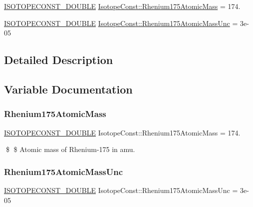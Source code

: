 \begin{DoxyCompactItemize}
\item 
\mbox{\hyperlink{group___isotope_const-_macros_ga8f45a7272ce02c0b4c65c44636ed719a}{I\+S\+O\+T\+O\+P\+E\+C\+O\+N\+S\+T\+\_\+\+D\+O\+U\+B\+LE}} \mbox{\hyperlink{group___isotope_const-_rhenium-_re175_ga8bc30c49a58f3edc6eab82715d9167f9}{Isotope\+Const\+::\+Rhenium175\+Atomic\+Mass}} = 174.
\item 
\mbox{\hyperlink{group___isotope_const-_macros_ga8f45a7272ce02c0b4c65c44636ed719a}{I\+S\+O\+T\+O\+P\+E\+C\+O\+N\+S\+T\+\_\+\+D\+O\+U\+B\+LE}} \mbox{\hyperlink{group___isotope_const-_rhenium-_re175_ga77a02acda7e5a92b5cf4a94a99b388d1}{Isotope\+Const\+::\+Rhenium175\+Atomic\+Mass\+Unc}} = 3e-\/05
\end{DoxyCompactItemize}


\subsection{Detailed Description}


\subsection{Variable Documentation}
\mbox{\label{group___isotope_const-_rhenium-_re175_ga8bc30c49a58f3edc6eab82715d9167f9}} 
\subsubsection{\texorpdfstring{Rhenium175\+Atomic\+Mass}{Rhenium175AtomicMass}}
{\footnotesize\ttfamily \mbox{\hyperlink{group___isotope_const-_macros_ga8f45a7272ce02c0b4c65c44636ed719a}{I\+S\+O\+T\+O\+P\+E\+C\+O\+N\+S\+T\+\_\+\+D\+O\+U\+B\+LE}} Isotope\+Const\+::\+Rhenium175\+Atomic\+Mass = 174.}

\$ \$ Atomic mass of Rhenium-\/175 in amu. \mbox{\label{group___isotope_const-_rhenium-_re175_ga77a02acda7e5a92b5cf4a94a99b388d1}} 
\subsubsection{\texorpdfstring{Rhenium175\+Atomic\+Mass\+Unc}{Rhenium175AtomicMassUnc}}
{\footnotesize\ttfamily \mbox{\hyperlink{group___isotope_const-_macros_ga8f45a7272ce02c0b4c65c44636ed719a}{I\+S\+O\+T\+O\+P\+E\+C\+O\+N\+S\+T\+\_\+\+D\+O\+U\+B\+LE}} Isotope\+Const\+::\+Rhenium175\+Atomic\+Mass\+Unc = 3e-\/05}

